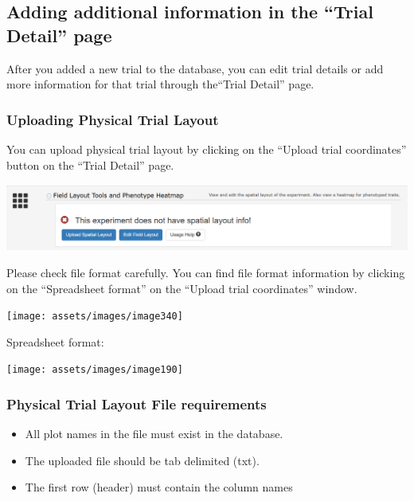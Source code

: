 \documentclass[
  12pt,
]{book}
\begin{document}
\hypertarget{adding-additional-information-in-the-trial-detail-page}{%
\subsection{Adding additional information in the ``Trial Detail'' page}\label{adding-additional-information-in-the-trial-detail-page}}

After you added a new trial to the database, you can edit trial details or add more information for that trial through the``Trial Detail'' page.

\hypertarget{uploading-physical-trial-layout}{%
\subsubsection*{Uploading Physical Trial Layout}\label{uploading-physical-trial-layout}}


You can upload physical trial layout by clicking on the ``Upload trial coordinates'' button on the ``Trial Detail'' page.

\begin{center}\includegraphics[width=0.75\linewidth]{assets/images/image332} \end{center}

Please check file format carefully. You can find file format information by clicking on the ``Spreadsheet format'' on the ``Upload trial coordinates'' window.

\begin{center}\texttt{[image: assets/images/image340]} \end{center}

Spreadsheet format:

\begin{center}\texttt{[image: assets/images/image190]} \end{center}

\hypertarget{physical-trial-layout-file-requirements}{%
\subsubsection*{Physical Trial Layout File requirements}\label{physical-trial-layout-file-requirements}}


\begin{itemize}
\item
  All plot names in the file must exist in the database.
\item
  The uploaded file should be tab delimited (txt).
\item
  The first row (header) must contain the column names
\end{itemize}
\end{document}
